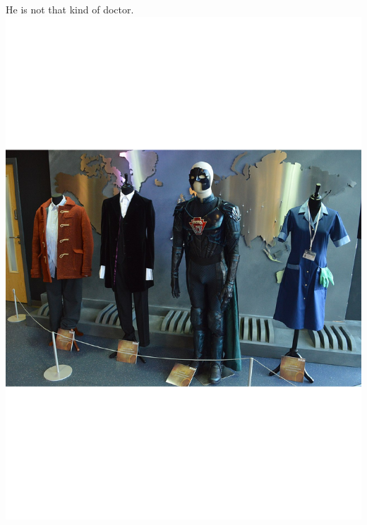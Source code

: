 \begin{Mfigure}{He is not that kind of doctor.}
 \centering
 \includegraphics[width=\linewidth]{Figure-C3.pdf}
 \caption[\figuretitle]
{\textbf{(A) Doctor Who?} Add as much text here as you want.}
\label{fig:c3}
\end{Mfigure}